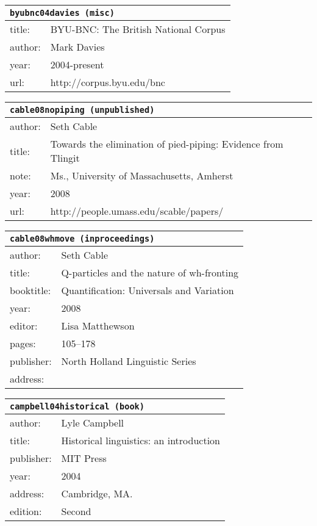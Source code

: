 \documentclass{article}
\begin{document}
\bigskip

\begin{tabular}{p{}p{}}
\multicolumn{2}{l}{\texttt{byubnc04davies (misc)}}\\
\hline
title: & \textsc{BYU-BNC}: The \textsc{B}ritish \textsc{N}ational \textsc{C}orpus\\
author: & Mark Davies\\
year: & 2004-present\\
url: & http://corpus.byu.edu/bnc\\
\end{tabular}

\bigskip

\begin{tabular}{p{}p{}}
\multicolumn{2}{l}{\texttt{cable08nopiping (unpublished)}}\\
\hline
author: & Seth Cable\\
title: & Towards the elimination of pied-piping: Evidence from \textsc{T}lingit\\
note: & \textsc{M}s., University of Massachusetts, Amherst\\
year: & 2008\\
url: & http://people.umass.edu/scable/papers/\\
\end{tabular}

\bigskip

\begin{tabular}{p{}p{}}
\multicolumn{2}{l}{\texttt{cable08whmove (inproceedings)}}\\
\hline
author: & Seth Cable\\
title: & Q-particles and the nature of {\sc wh}-fronting\\
booktitle: & Quantification: Universals and Variation\\
year: & 2008\\
editor: & Lisa Matthewson\\
pages: & 105--178\\
publisher: & North Holland Linguistic Series\\
address: & \\
\end{tabular}

\bigskip

\begin{tabular}{p{}p{}}
\multicolumn{2}{l}{\texttt{campbell04historical (book)}}\\
\hline
author: & Lyle Campbell\\
title: & Historical linguistics: an introduction\\
publisher: & MIT Press\\
year: & 2004\\
address: & Cambridge, MA.\\
edition: & Second\\
\end{tabular}
\end{document}
